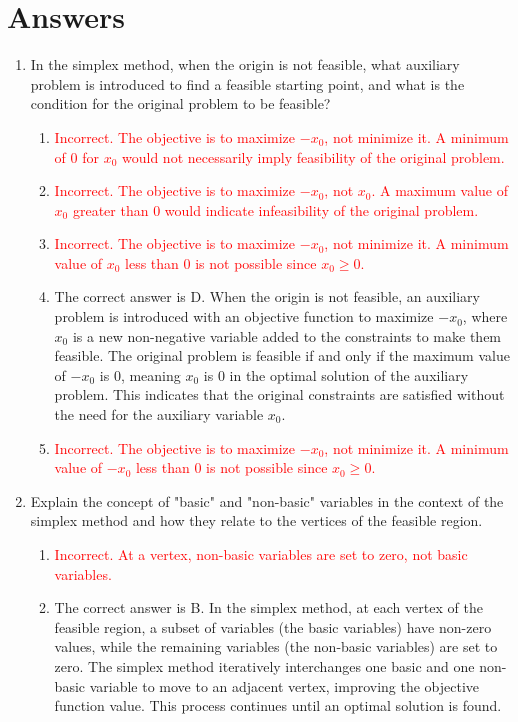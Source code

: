\documentclass{article}%
\newcommand{\incorrect}[1]{\textcolor{red}{#1}}
\begin{document}
%
\newpage%
\section{Answers}%
\label{sec:Answers}%
\begin{enumerate}%
\item In the simplex method, when the origin is not feasible, what auxiliary problem is introduced to find a feasible starting point, and what is the condition for the original problem to be feasible?%
\begin{enumerate}%
\item \incorrect{Incorrect. The objective is to maximize $-x_0$, not minimize it.  A minimum of 0 for $x_0$ would not necessarily imply feasibility of the original problem.}%
\item \incorrect{Incorrect. The objective is to maximize $-x_0$, not $x_0$.  A maximum value of $x_0$ greater than 0 would indicate infeasibility of the original problem.}%
\item \incorrect{Incorrect. The objective is to maximize $-x_0$, not minimize it. A minimum value of $x_0$ less than 0 is not possible since $x_0 \ge 0$.}%
\item The correct answer is D.  When the origin is not feasible, an auxiliary problem is introduced with an objective function to maximize $-x_0$, where $x_0$ is a new non-negative variable added to the constraints to make them feasible. The original problem is feasible if and only if the maximum value of $-x_0$ is 0, meaning $x_0$ is 0 in the optimal solution of the auxiliary problem. This indicates that the original constraints are satisfied without the need for the auxiliary variable $x_0$.%
\item \incorrect{Incorrect. The objective is to maximize $-x_0$, not minimize it.  A minimum value of $-x_0$ less than 0 is not possible since $x_0 \ge 0$.}%
\end{enumerate}%
\vspace{1em}%
\item Explain the concept of "basic" and "non-basic" variables in the context of the simplex method and how they relate to the vertices of the feasible region.%
\begin{enumerate}%
\item \incorrect{Incorrect.  At a vertex, non-basic variables are set to zero, not basic variables.}%
\item The correct answer is B. In the simplex method, at each vertex of the feasible region, a subset of variables (the basic variables) have non-zero values, while the remaining variables (the non-basic variables) are set to zero.  The simplex method iteratively interchanges one basic and one non-basic variable to move to an adjacent vertex, improving the objective function value. This process continues until an optimal solution is found.%

\end{enumerate}
\end{enumerate}
\end{document}
